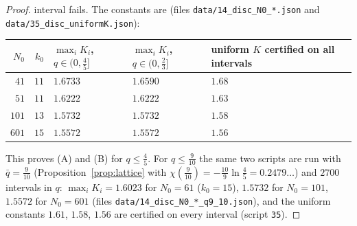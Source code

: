 \documentclass[11pt,a4paper]{article}
\theoremstyle{definition}
\theoremstyle{remark}
\begin{document}
\begin{proof}
interval fails. %
The constants are (files \texttt{data/14\_disc\_N0\_*.json} and \texttt{data/35\_disc\_uniformK.json}):
\begin{center}\small
\begin{tabular}{rrlll}
\toprule
$N_0$ & $k_0$ & $\max_iK_i$, $q\in(0,\frac45]$ & $\max_iK_i$, $q\in(0,\frac23]$ & uniform $K$ certified on all intervals\\
\midrule
$41$ & $11$ & $1.6733$ & $1.6590$ & $1.68$\\
$51$ & $11$ & $1.6222$ & $1.6222$ & $1.63$\\
$101$ & $13$ & $1.5732$ & $1.5732$ & $1.58$\\
$601$ & $15$ & $1.5572$ & $1.5572$ & $1.56$\\
\bottomrule
\end{tabular}
\end{center}
This proves (A) and (B) for $q\le\frac45$. For $q\le\frac9{10}$ the same two scripts are run with $\bar q=\frac9{10}$
(Proposition~\ref{prop:lattice} with $\chi(\frac9{10})=-\frac{10}9\ln\frac45=0.2479\ldots$) and $2700$ intervals in $q$:
$\max_iK_i=1.6023$ for $N_0=61$ ($k_0=15$), $1.5732$ for $N_0=101$, $1.5572$ for $N_0=601$
(files \texttt{data/14\_disc\_N0\_*\_q9\_10.json}), and the uniform constants $1.61$, $1.58$, $1.56$ are certified on every
interval (script \texttt{35}). %
\end{proof}
\end{document}
